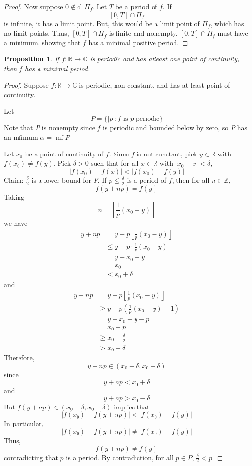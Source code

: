 \documentclass[12pt, reqno]{amsart}
\newtheorem{prop}{Proposition}[section]
\theoremstyle{definition}
\theoremstyle{remark}
\begin{document}
\begin{itemize}
\begin{proof}
Now suppose $0\notin \text{cl }\Pi_f$. Let $T$ be a period of $f$. If $$[0,T]\cap \Pi_{f}$$is infinite, it has a limit point. But, this would be a limit point of $\Pi_f$, which has no limit points. Thus, $[0,T]\cap \Pi_f$ is finite and nonempty. $[0,T]\cap \Pi_f$ must have a minimum, showing that $f$ has a minimal positive period. 
   
\end{proof}


\begin{prop}
   If $f:\mathbb{R}\to\mathbb{C}$ is periodic and has atleast one point of continuity, then $f$ has a minimal period.
\end{prop}

\begin{proof}
   
Suppose $f:\mathbb{R}\rightarrow \mathbb{C}$ is periodic, non-constant, and has at least point of continuity. 

Let $$P=\{|p|:f \text{ is }p \text{-periodic}\}$$
Note that $P$ is nonempty since $f$ is periodic and bounded below by zero, so $P$ has an infimum $\alpha=\inf P$



Let $x_{0}$ be a point of continuity of $f$. Since $f$ is not constant, pick $y\in \mathbb{R}$ with $f(x_{0})\ne f(y)$. Pick $\delta>0$ such that for all $x\in \mathbb{R}$ with $|x_{0}-x|<\delta$, $$|f(x_{0})-f(x)|<|f(x_{0})-f(y)|$$ 
Claim: $\frac{\delta}{2}$ is a lower bound for $P$. If $p\le \frac{\delta}{2}$ is a period of $f$, then for all $n\in \mathbb{Z}$, $$f(y+np)=f(y)$$Taking $$n=\left\lfloor \frac{1}{p}(x_{0}-y)\right\rfloor$$we have \begin{align*}
y+np &= y+p\left\lfloor \frac{1}{p}(x_{0}-y)\right\rfloor\\
&\le y+p\cdot \frac{1}{p}(x_{0}-y)\\
&= y+x_{0}-y\\
&= x_{0}\\
&< x_{0}+\delta
\end{align*}
and \begin{align*}
y+np&= y+p\left\lfloor \frac{1}{p}(x_{0}-y)\right\rfloor\\
&\ge y+p\left(\frac{1}{p}(x_{0}-y)-1\right)\\
&= y+x_{0}-y-p\\
&= x_{0}-p\\
&\ge x_{0}- \frac{\delta}{2}\\
&> x_{0}-\delta
\end{align*}
Therefore, $$
y+np\in(x_{0}-\delta,x_{0}+\delta)
$$since $$y+np< x_{0}+\delta$$and $$y+np> x_{0}-\delta$$
But $f(y+np)\in(x_{0}-\delta,x_{0}+\delta)$ implies that $$
|f(x_{0})-f(y+np)|<|f(x_{0})-f(y)|
$$In particular, $$|f(x_{0})-f(y+np)|\ne|f(x_{0})-f(y)|$$Thus, $$f(y+np)\ne f(y)$$contradicting that $p$ is a period. By contradiction, for all $p\in P$, $\frac{\delta}{2}<p$.



\end{proof}
\end{itemize}
\end{document}

